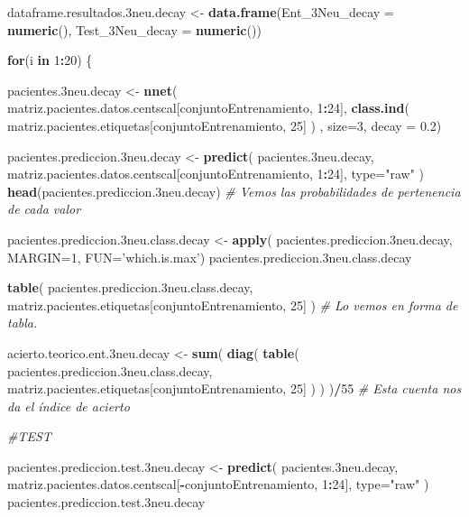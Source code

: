 \documentclass[]{article}
\newenvironment{Shaded}{\begin{snugshade}}{\end{snugshade}}
\newcommand{\KeywordTok}[1]{\textcolor[rgb]{0.13,0.29,0.53}{\textbf{#1}}}
\newcommand{\DataTypeTok}[1]{\textcolor[rgb]{0.13,0.29,0.53}{#1}}
\newcommand{\DecValTok}[1]{\textcolor[rgb]{0.00,0.00,0.81}{#1}}
\newcommand{\FloatTok}[1]{\textcolor[rgb]{0.00,0.00,0.81}{#1}}
\newcommand{\StringTok}[1]{\textcolor[rgb]{0.31,0.60,0.02}{#1}}
\newcommand{\CommentTok}[1]{\textcolor[rgb]{0.56,0.35,0.01}{\textit{#1}}}
\newcommand{\ControlFlowTok}[1]{\textcolor[rgb]{0.13,0.29,0.53}{\textbf{#1}}}
\newcommand{\OperatorTok}[1]{\textcolor[rgb]{0.81,0.36,0.00}{\textbf{#1}}}
\newcommand{\NormalTok}[1]{#1}
\begin{document}
\begin{Shaded}
\begin{Highlighting}[]
\NormalTok{dataframe.resultados.3neu.decay <-}\StringTok{ }\KeywordTok{data.frame}\NormalTok{(}\DataTypeTok{Ent_3Neu_decay =} \KeywordTok{numeric}\NormalTok{(),}
                                              \DataTypeTok{Test_3Neu_decay =} \KeywordTok{numeric}\NormalTok{())}

\ControlFlowTok{for}\NormalTok{(i }\ControlFlowTok{in} \DecValTok{1}\OperatorTok{:}\DecValTok{20}\NormalTok{)}
\NormalTok{\{}

\NormalTok{  pacientes.3neu.decay <-}\StringTok{ }\KeywordTok{nnet}\NormalTok{( matriz.pacientes.datos.centscal[conjuntoEntrenamiento, }\DecValTok{1}\OperatorTok{:}\DecValTok{24}\NormalTok{], }\KeywordTok{class.ind}\NormalTok{( matriz.pacientes.etiquetas[conjuntoEntrenamiento, }\DecValTok{25}\NormalTok{] ) , }\DataTypeTok{size=}\DecValTok{3}\NormalTok{, }\DataTypeTok{decay =} \FloatTok{0.2}\NormalTok{)}
  
\NormalTok{  pacientes.prediccion.3neu.decay <-}\StringTok{ }\KeywordTok{predict}\NormalTok{( pacientes.3neu.decay, matriz.pacientes.datos.centscal[conjuntoEntrenamiento, }\DecValTok{1}\OperatorTok{:}\DecValTok{24}\NormalTok{], }\DataTypeTok{type=}\StringTok{"raw"}\NormalTok{ )}
  \KeywordTok{head}\NormalTok{(pacientes.prediccion.3neu.decay) }\CommentTok{# Vemos las probabilidades de pertenencia de cada valor}
  
  
\NormalTok{  pacientes.prediccion.3neu.class.decay <-}\StringTok{ }\KeywordTok{apply}\NormalTok{( pacientes.prediccion.3neu.decay, }\DataTypeTok{MARGIN=}\DecValTok{1}\NormalTok{, }\DataTypeTok{FUN=}\StringTok{'which.is.max'}\NormalTok{)}
\NormalTok{  pacientes.prediccion.3neu.class.decay}
  
  
  \KeywordTok{table}\NormalTok{( pacientes.prediccion.3neu.class.decay, matriz.pacientes.etiquetas[conjuntoEntrenamiento, }\DecValTok{25}\NormalTok{] )  }\CommentTok{# Lo vemos en forma de tabla.}
  
  
\NormalTok{  acierto.teorico.ent.3neu.decay <-}\StringTok{ }\KeywordTok{sum}\NormalTok{( }\KeywordTok{diag}\NormalTok{( }\KeywordTok{table}\NormalTok{( pacientes.prediccion.3neu.class.decay, matriz.pacientes.etiquetas[conjuntoEntrenamiento, }\DecValTok{25}\NormalTok{] ) ) )}\OperatorTok{/}\DecValTok{55} \CommentTok{# Esta cuenta nos da el índice de acierto}
  
  \CommentTok{#TEST}
  
\NormalTok{  pacientes.prediccion.test.3neu.decay <-}\StringTok{ }\KeywordTok{predict}\NormalTok{( pacientes.3neu.decay, matriz.pacientes.datos.centscal[}\OperatorTok{-}\NormalTok{conjuntoEntrenamiento, }\DecValTok{1}\OperatorTok{:}\DecValTok{24}\NormalTok{], }\DataTypeTok{type=}\StringTok{"raw"}\NormalTok{ )}
\NormalTok{  pacientes.prediccion.test.3neu.decay}
  

\end{Highlighting}
\end{Shaded}
\end{document}

